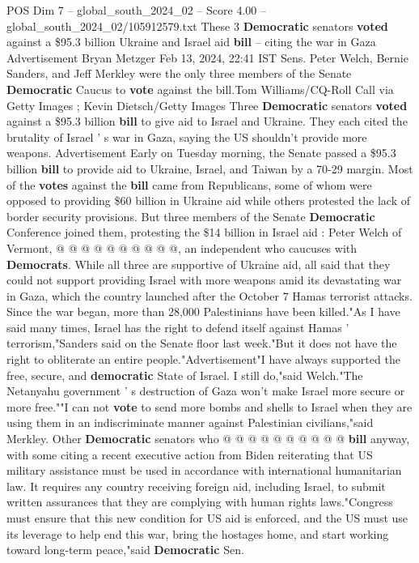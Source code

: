 \begin{textsample}{POS Dim 7 – global\_south\_2024\_02 – Score 4.00 – global\_south\_2024\_02/105912579.txt}  \label{ex:f7_pos_204}
These 3 \textbf{Democratic} senators \textbf{voted} against a \$95.3 billion Ukraine and Israel aid \textbf{bill} -- citing the war in Gaza Advertisement Bryan Metzger Feb 13, 2024, 22:41 IST Sens.
Peter Welch, Bernie Sanders, and Jeff Merkley were the only three members of the Senate \textbf{Democratic} Caucus to \textbf{vote} against the bill.Tom Williams/CQ-Roll Call via Getty Images ; Kevin Dietsch/Getty Images Three \textbf{Democratic} senators \textbf{voted} against a \$95.3 billion \textbf{bill} to give aid to Israel and Ukraine.
They each cited the brutality of Israel ' s war in Gaza, saying the US shouldn't provide more weapons.
Advertisement Early on Tuesday morning, the Senate passed a \$95.3 billion \textbf{bill} to provide aid to Ukraine, Israel, and Taiwan by a 70-29 margin.
Most of the \textbf{votes} against the \textbf{bill} came from Republicans, some of whom were opposed to providing \$60 billion in Ukraine aid while others protested the lack of border security provisions.
But three members of the Senate \textbf{Democratic} Conference joined them, protesting the \$14 billion in Israel aid : Peter Welch of Vermont, @ @ @ @ @ @ @ @ @ @, an independent who caucuses with \textbf{Democrats}.
While all three are supportive of Ukraine aid, all said that they could not support providing Israel with more weapons amid its devastating war in Gaza, which the country launched after the October 7 Hamas terrorist attacks.
Since the war began, more than 28,000 Palestinians have been killed."As I have said many times, Israel has the right to defend itself against Hamas ' terrorism,"Sanders said on the Senate floor last week."But it does not have the right to obliterate an entire people."Advertisement"I have always supported the free, secure, and \textbf{democratic} State of Israel.
I still do,"said Welch."The Netanyahu government ' s destruction of Gaza won't make Israel more secure or more free.""I can not \textbf{vote} to send more bombs and shells to Israel when they are using them in an indiscriminate manner against Palestinian civilians,"said Merkley.
Other \textbf{Democratic} senators who @ @ @ @ @ @ @ @ @ @ \textbf{bill} anyway, with some citing a recent executive action from Biden reiterating that US military assistance must be used in accordance with international humanitarian law.
It requires any country receiving foreign aid, including Israel, to submit written assurances that they are complying with human rights laws."Congress must ensure that this new condition for US aid is enforced, and the US must use its leverage to help end this war, bring the hostages home, and start working toward long-term peace,"said \textbf{Democratic} Sen.

\end{textsample}
